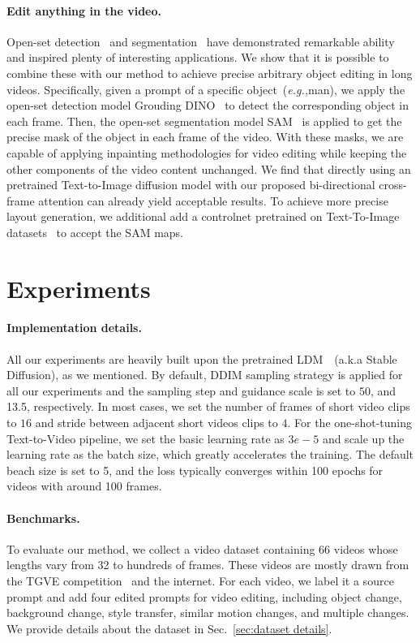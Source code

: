 \documentclass{article}
\def\eg{\emph{e.g.,}}
\begin{document}
\paragraph{Edit anything in the video.}
Open-set detection~\cite{liu2023grounding} and segmentation~\cite{kirillov2023segment} have demonstrated remarkable ability and inspired plenty of interesting applications. We show that it is possible to combine these with our method to achieve precise arbitrary object editing in long videos. Specifically, given a prompt of a specific object~(\eg man), we apply the open-set detection model Grouding DINO~\cite{liu2023grounding} to detect the corresponding object in each frame. Then, the open-set segmentation model SAM~\cite{kirillov2023segment} is applied to get the precise mask of the object in each frame of the video. With these masks, we are capable of applying inpainting methodologies for video editing while keeping the other components of the video content unchanged. We find that directly using an pretrained Text-to-Image diffusion model with our proposed bi-directional cross-frame attention can already yield acceptable results. To achieve more precise layout generation, we additional add a controlnet pretrained on Text-To-Image datasets~\cite{laion5b} to accept the SAM maps. 
\section{Experiments}
\paragraph{Implementation details.}
All our experiments are heavily built upon the pretrained LDM~\cite{rombach2022high}~(a.k.a Stable Diffusion), as we mentioned. By default, DDIM sampling strategy is applied for all our experiments and the sampling step and guidance scale is set to $50$, and 13.5, respectively. In most cases, we set the number of frames of short video clips to $16$ and stride between adjacent short videos clips to $4$. For the one-shot-tuning Text-to-Video pipeline, we set the basic learning rate as $3e-5$ and scale up the learning rate as the batch size, which greatly accelerates the training. The default beach size is set to 5, and the loss typically converges within 100 epochs for videos with around 100 frames.
\paragraph{Benchmarks.}
To evaluate our method, we collect a video dataset containing 66 videos whose lengths vary from 32 to hundreds of frames. These videos are mostly drawn from the TGVE competition~\cite{wu2022tune} and the internet. For each video, we label it a source prompt and add four edited prompts for video editing, including object change, background change, style transfer, similar motion changes, and multiple changes. We provide details about the dataset in Sec.~\ref{sec:dataset details}.
\end{document}
